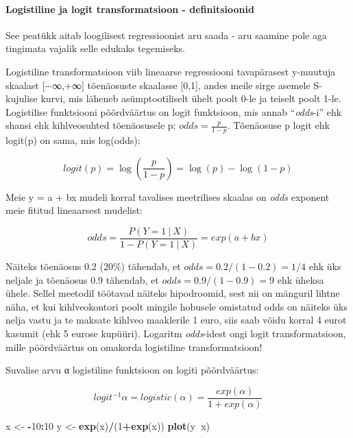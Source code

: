 \documentclass[]{article}
\newenvironment{Shaded}{\begin{snugshade}}{\end{snugshade}}
\newcommand{\KeywordTok}[1]{\textcolor[rgb]{0.13,0.29,0.53}{\textbf{#1}}}
\newcommand{\DecValTok}[1]{\textcolor[rgb]{0.00,0.00,0.81}{#1}}
\newcommand{\StringTok}[1]{\textcolor[rgb]{0.31,0.60,0.02}{#1}}
\newcommand{\OperatorTok}[1]{\textcolor[rgb]{0.81,0.36,0.00}{\textbf{#1}}}
\newcommand{\NormalTok}[1]{#1}
\let\oldparagraph\paragraph
\renewcommand{\paragraph}[1]{\oldparagraph{#1}\mbox{}}
\begin{document}
\paragraph{Logistiline ja logit transformatsioon -
definitsioonid}\label{logistiline-ja-logit-transformatsioon---definitsioonid}

See peatükk aitab loogilisest regressioonist aru saada - aru saamine
pole aga tingimata vajalik selle edukaks tegemiseks.

Logistiline transformatsioon viib lineaarse regressiooni tavapärasest
y-muutuja skaalast {[}−∞,+∞{]} tõenäosuste skaalasse {[}0,1{]}, andes
meile sirge asemele S-kujulise kurvi, mis läheneb asümptootiliselt ühelt
poolt 0-le ja teiselt poolt 1-le. Logistilise funktsiooni põõrdväärtus
on logit funktsioon, mis annab ``\emph{odds}-i'' ehk shansi ehk
kihlveosuhted tõenäosusele p: \(odds = \frac {p}{1 − p}\). Tõenäosuse p
logit ehk logit(p) on sama, mis log(odds):

\[logit(p)=\log \left({\frac {p}{1-p}}\right)=\log(p)-\log(1-p)\]

Meie y = a + bx mudeli korral tavalises meetrilises skaalas on
\emph{odds} exponent meie fititud lineaarsest mudelist:

\[odds= \frac {P(Y = 1 ~|~ X)}{1-P(Y = 1 ~|~ X)} = exp(a+bx)\]

Näiteks tõenäosus 0.2 (20\%) tähendab, et \(odds = 0.2/(1 - 0.2) = 1/4\)
ehk üks neljale ja tõenäosus 0.9 tähendab, et
\(odds = 0.9/(1 - 0.9) = 9\) ehk üheksa ühele. Sellel meetodil töötavad
näiteks hipodroomid, sest nii on mänguril lihtne näha, et kui
kihlveokontori poolt mingile hobusele omistatud odds on näiteks üks
nelja vastu ja te maksate kihlveo maaklerile 1 euro, siis saab võidu
korral 4 eurot kasumit (ehk 5 eurose kupüüri). Logaritm
\emph{odds}-idest ongi logit transformatsioon, mille pöördväärtus on
omakorda logistiline transformatsioon!

Suvalise arvu α logistiline funktsioon on logiti põõrdväärtus:

\[logit^{-1}\alpha=logistic (\alpha)={\frac {exp (\alpha) }{1+ exp (\alpha)}}\]

\begin{Shaded}
\begin{Highlighting}[]
\NormalTok{x <-}\StringTok{ }\OperatorTok{-}\DecValTok{10}\OperatorTok{:}\DecValTok{10}
\NormalTok{y <-}\StringTok{ }\KeywordTok{exp}\NormalTok{(x)}\OperatorTok{/}\NormalTok{(}\DecValTok{1}\OperatorTok{+}\KeywordTok{exp}\NormalTok{(x))}
\KeywordTok{plot}\NormalTok{(y}\OperatorTok{~}\NormalTok{x)}
\end{Highlighting}
\end{Shaded}
\end{document}
